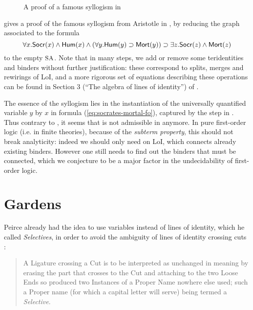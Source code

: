 \begin{figure*}
  \begin{center}
  \end{center}
  \caption{A proof of a famous syllogism in }
\end{figure*}

 gives a proof of the famous syllogism from Aristotle
in , by reducing the graph associated to the formula
\begin{equation}
  \forall x. \mbox{\textsf{Socr}}(x) \land \mbox{\textsf{Hum}}(x) \land (\forall y. \mbox{\textsf{Hum}}(y) \supset
\mbox{\textsf{Mort}}(y)) \supset \exists z. \mbox{\textsf{Socr}}(z) \land \mbox{\textsf{Mort}}(z) \label{eq:socrates-mortal-fo}
\end{equation}
to the empty $\small\textsc{SA}$. Note that in many steps, we add or remove some teridentities and
binders without further justification: these correspond to splits, merges and
rewirings of LoI, and a more rigorous set of equations describing these
operations can be found in Section 3 (``The algebra of lines of identity'') of
\cite{pietarinen_compositional_2020}.

The essence of the syllogism lies in the instantiation of the universally
quantified variable $y$ by $x$ in formula (\ref{eq:socrates-mortal-fo}),
captured by the  step in . Thus
contrary to , it seems that  is not admissible in
 anymore. In pure first-order logic (i.e. in finite theories), because
of the \emph{subterm property}, this should not break
analyticity: indeed we should only need  on LoI, which connects
already existing binders. However one still needs to find out the binders
that must be connected, which we conjecture to be a major factor in the
undecidability of first-order logic.

\section{Gardens}

Peirce already had the idea to use variables instead of lines of identity, which
he called \emph{Selectives}, in order to avoid the ambiguity of lines of
identity crossing cuts \cite[p.~531]{peirce_prolegomena_1906}:

\begin{quote}
A Ligature crossing a Cut is to be interpreted as unchanged in meaning by
erasing the part that crosses to the Cut and attaching to the two Loose Ends so
produced two Instances of a Proper Name nowhere else used; such a Proper name
(for which a capital letter will serve) being termed a \emph{Selective}.
\end{quote}

